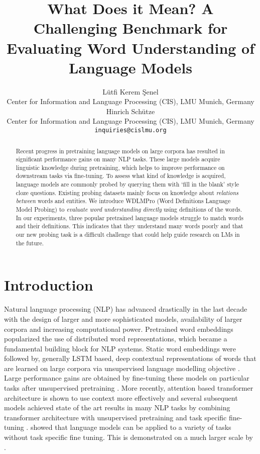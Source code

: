 \documentclass[11pt,a4paper]{article}
\title{What Does it Mean? A Challenging Benchmark for Evaluating Word Understanding of Language Models}
\author{Lütfi Kerem Şenel \\
  Center for Information and Language Processing (CIS), LMU Munich, Germany \\
  Hinrich Schütze \\
    Center for Information and Language Processing (CIS), LMU Munich, Germany \\
  \texttt{inquiries@cislmu.org} \\
  }
\date{}
\begin{document}
\maketitle
\begin{abstract}

Recent progress in pretraining language models on large
corpora has resulted in significant performance gains on many NLP
tasks. These large models acquire linguistic knowledge
during pretraining, which helps to improve
performance on downstream tasks via fine-tuning. To assess
what kind of knowledge is acquired,
language models are commonly probed by querying them with
`fill in the blank' style cloze questions. Existing probing
datasets mainly focus on knowledge about \emph{relations between}
words and entities. We introduce WDLMPro (Word Definitions
Language Model Probing) to \emph{evaluate word understanding directly} using definitions of
the words. In our experiments, three popular pretrained
language models
struggle to match words and their  definitions. This
indicates that they understand many words poorly and that
our new probing task is a difficult challenge that could
help guide research on LMs in the future.
\end{abstract}



\section{Introduction}

Natural language processing (NLP)  has advanced drastically
in the last decade with the design of larger and more
sophisticated models, availability of larger
corpora and increasing computational
power. Pretrained word embeddings
\cite{mikolov13word2vec_b, pennington14glove} popularized
the use of distributed word representations, which became a
fundamental building block for NLP systems. Static word
embeddings were followed by, generally LSTM based, deep
contextual representations of words that are learned on
large corpora via unsupervised language modelling objective
\cite{peters18ELMO}. Large performance gains are obtained
by fine-tuning these models on particular tasks after
unsupervised pretraining \cite{radford18fineTuning,
  howard18ULMFiT}. More recently, attention based
transformer architecture is shown to use context more
effectively \cite{vaswani17transformers} and several
subsequent models achieved state of the art results in many
NLP tasks by combining transformer architecture with
unsupervised pretraining and task specific fine-tuning
\cite{devlin19BERT, liu19RoBERTa}. 
showed that language models can be applied to a variety of
tasks without task specific fine tuning. This is demonstrated on a much larger scale by . 
\end{document}
